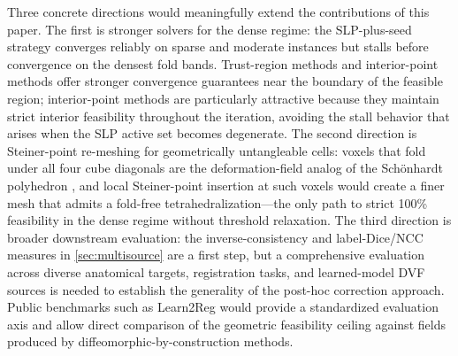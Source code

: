\documentclass[lettersize,journal]{IEEEtran}
\begin{document}
Three concrete directions would meaningfully extend the contributions of this paper. The first is stronger solvers for the dense regime: the SLP-plus-seed strategy converges reliably on sparse and moderate instances but stalls before convergence on the densest fold bands. Trust-region methods \cite{Conn2000} and interior-point methods \cite{Byrd2000} offer stronger convergence guarantees near the boundary of the feasible region; interior-point methods are particularly attractive because they maintain strict interior feasibility throughout the iteration, avoiding the stall behavior that arises when the SLP active set becomes degenerate. The second direction is Steiner-point re-meshing for geometrically untangleable cells: voxels that fold under all four cube diagonals are the deformation-field analog of the Sch{\"o}nhardt polyhedron \cite{schonhardt1928}, and local Steiner-point insertion at such voxels would create a finer mesh that admits a fold-free tetrahedralization---the only path to strict 100\% feasibility in the dense regime without threshold relaxation. The third direction is broader downstream evaluation: the inverse-consistency and label-Dice/NCC measures in \autoref{sec:multisource} are a first step, but a comprehensive evaluation across diverse anatomical targets, registration tasks, and learned-model DVF sources is needed to establish the generality of the post-hoc correction approach. Public benchmarks such as Learn2Reg \cite{learn2reg2023} would provide a standardized evaluation axis and allow direct comparison of the geometric feasibility ceiling against fields produced by diffeomorphic-by-construction methods.



\end{document}
